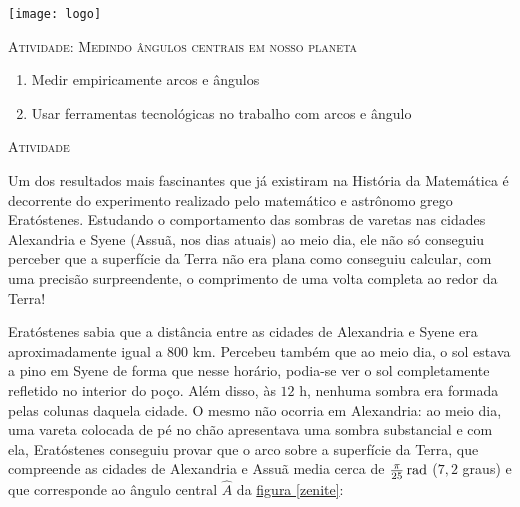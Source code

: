 \documentclass[10 pt,usenames,dvipsnames, oneside]{article}
\begin{document}
\begin{center}
  \begin{minipage}[l]{3cm}
\texttt{[image: logo]}    
\end{minipage}\hfill
\begin{minipage}[r]{.8\textwidth}
 {\Large \scshape Atividade: Medindo ângulos centrais em nosso planeta}  
\end{minipage}
\end{center}
\vspace{.2cm}

\ifdefined\prof

\begin{goals}
\begin{enumerate}
\item Medir empiricamente arcos e ângulos
\item Usar ferramentas tecnológicas no trabalho com arcos e ângulo
\end{enumerate}


\end{goals}

\bigskip
\begin{center}
{\large \scshape Atividade}
\end{center}
\fi

Um dos resultados mais fascinantes que já existiram na História da Matemática é decorrente do experimento realizado pelo matemático e astrônomo grego Eratóstenes. Estudando o comportamento das sombras de varetas nas cidades Alexandria e Syene (Assuã, nos dias atuais) ao meio dia, ele não só conseguiu perceber que a superfície da Terra não era plana como conseguiu calcular, com uma precisão surpreendente, o comprimento de uma volta completa ao redor da Terra!

Eratóstenes sabia que a distância entre as cidades de Alexandria e Syene era aproximadamente igual a $800$ km. Percebeu também que ao meio dia, o sol estava a pino em Syene de forma que nesse horário, podia-se ver o sol completamente refletido no interior do poço. Além disso, às $12$ h, nenhuma sombra era formada pelas colunas daquela cidade. O mesmo não ocorria em Alexandria: ao meio dia, uma vareta colocada de pé no chão apresentava uma sombra substancial e com ela, Eratóstenes conseguiu provar que o arco sobre a superfície da Terra, que compreende as cidades de Alexandria e Assuã media cerca de $\frac{\pi}{25}\operatorname{rad}$ ($7{,}2$ graus) e que corresponde ao ângulo central $\hat{A}$ da \hyperref[zenite]{figura \ref{zenite}}:
\end{document}
